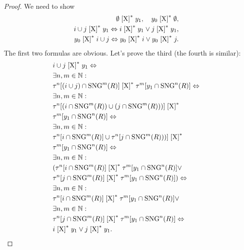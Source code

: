 \begin{proof}
We need to show
\begin{align*}
\emptyset\mathrel{\left[\mathrm{X}\right]^{\ast}}y_1,\quad
y_0\mathrel{\left[\mathrm{X}\right]^{\ast}}\emptyset,\\
i\cup j\mathrel{\left[\mathrm{X}\right]^{\ast}}y_1 \Leftrightarrow
i\mathrel{\left[\mathrm{X}\right]^{\ast}}y_1\lor j\mathrel{\left[\mathrm{X}\right]^{\ast}}y_1,\\
y_0\mathrel{\left[\mathrm{X}\right]^{\ast}}i\cup j \Leftrightarrow
y_0\mathrel{\left[\mathrm{X}\right]^{\ast}}i\lor y_0\mathrel{\left[\mathrm{X}\right]^{\ast}}j.
\end{align*}
The first two formulas are obvious. Let's prove the third (the fourth is similar):
\begin{align*}
&i\cup j\mathrel{\left[\mathrm{X}\right]^{\ast}}y_1 \Leftrightarrow \\&
\exists n,m\in\mathbb{N}:\\& 
\tau^n[(i\cup j)\cap\operatorname{SNG}^m(R)] \mathrel{\left[\mathrm{X}\right]^{\ast}}
\tau^m[y_1\cap\operatorname{SNG}^n(R)] \Leftrightarrow \\&
\exists n,m\in\mathbb{N}:\\& 
\tau^n[(i\cap\operatorname{SNG}^m(R))\cup(j\cap\operatorname{SNG}^m(R)))] \mathrel{\left[\mathrm{X}\right]^{\ast}}\\&
\tau^m[y_1\cap\operatorname{SNG}^n(R)] \Leftrightarrow \\&
\exists n,m\in\mathbb{N}:\\& 
\tau^n[i\cap\operatorname{SNG}^m(R)]\cup\tau^n[j\cap\operatorname{SNG}^m(R)))] \mathrel{\left[\mathrm{X}\right]^{\ast}}\\&
\tau^m[y_1\cap\operatorname{SNG}^n(R)] \Leftrightarrow \\&
\exists n,m\in\mathbb{N}:\\& 
(\tau^n[i\cap\operatorname{SNG}^m(R)]\mathrel{\left[\mathrm{X}\right]^{\ast}}
\tau^m[y_1\cap\operatorname{SNG}^n(R)] \lor \\&
\tau^n[j\cap\operatorname{SNG}^m(R)]\mathrel{\left[\mathrm{X}\right]^{\ast}}
\tau^m[y_1\cap\operatorname{SNG}^n(R)]) \Leftrightarrow \\&
\exists n,m\in\mathbb{N}:\\& 
\tau^n[i\cap\operatorname{SNG}^m(R)]\mathrel{\left[\mathrm{X}\right]^{\ast}}
\tau^m[y_1\cap\operatorname{SNG}^n(R)] \lor \\&
\exists n,m\in\mathbb{N}:\\& 
\tau^n[j\cap\operatorname{SNG}^m(R)]\mathrel{\left[\mathrm{X}\right]^{\ast}}
\tau^m[y_1\cap\operatorname{SNG}^n(R)] \Leftrightarrow \\&
i\mathrel{\left[\mathrm{X}\right]^{\ast}}y_1\lor j\mathrel{\left[\mathrm{X}\right]^{\ast}}y_1.
\end{align*}
\end{proof}

